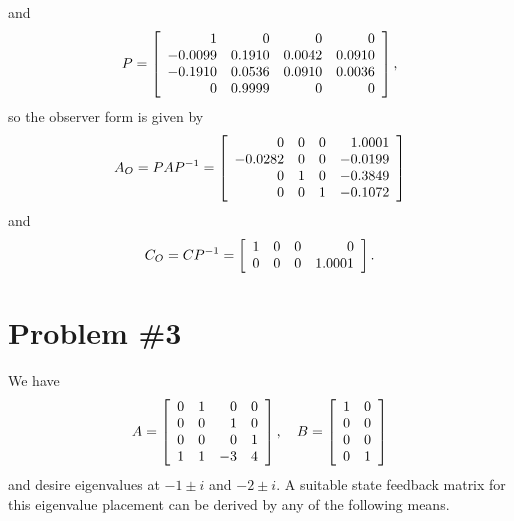 \documentclass{article}
\begin{document}
\begin{enumerate}[(a)]
{$$      $$
      and
      $$
      P =
      \left[\begin{array}{r r r r}
             1 &      0 &      0 &      0 \\
       -0.0099 & 0.1910 & 0.0042 & 0.0910 \\
       -0.1910 & 0.0536 & 0.0910 & 0.0036 \\
             0 & 0.9999 &      0 &      0
      \end{array}\right],
      $$
      so the observer form is given by
      $$
      A_O = P A P^{-1} =
      \left[\begin{array}{r r r r}
             0 & 0 & 0 &  1.0001 \\
       -0.0282 & 0 & 0 & -0.0199 \\
             0 & 1 & 0 & -0.3849 \\
             0 & 0 & 1 & -0.1072
      \end{array}\right]
      $$
      and
      $$
      C_O = CP^{-1} =
      \left[\begin{array}{r r r r}
        1 & 0 & 0 &      0 \\
        0 & 0 & 0 & 1.0001
      \end{array}\right].
      $$
}
\end{enumerate}

\pagebreak

\section*{Problem \#3}
We have
$$
A =
\left[\begin{array}{r r r r}
  0 & 1 &  0 & 0 \\
  0 & 0 &  1 & 0 \\
  0 & 0 &  0 & 1 \\
  1 & 1 & -3 & 4
\end{array}\right], \quad
B =
\left[\begin{array}{r r}
  1 & 0 \\
  0 & 0 \\
  0 & 0 \\
  0 & 1
\end{array}\right]
$$
and desire eigenvalues at $-1 \pm i$ and $-2 \pm i$.
A suitable state feedback matrix for this eigenvalue placement can be
derived by any of the following means.
\end{document}
